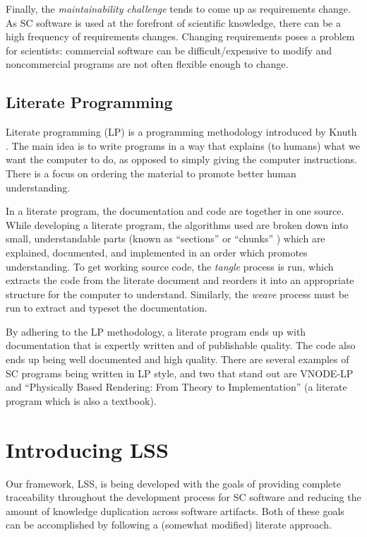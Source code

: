 \documentclass{sig-alternate-05-2015}
\newcommand{\lss}{LSS}
\begin{document}
Finally, the \textit{maintainability challenge} tends to come up as requirements
change. As SC software is used at the forefront of scientific knowledge, there
can be a high frequency of requirements changes. Changing requirements poses a
problem for scientists: commercial software can be difficult/expensive to modify
and noncommercial programs are not often flexible enough to change.

\subsection{Literate Programming} \label{ssec:literate}

Literate programming (LP) is a programming methodology introduced by Knuth
\cite{Knuth1984}. The main idea is to write programs in a way that explains (to
humans) what we want the computer to do, as opposed to simply giving the
computer instructions. There is a focus on ordering the material to promote
better human understanding.

In a literate program, the documentation and code are together in one source.
While developing a literate program, the algorithms used are broken down into
small, understandable parts (known as ``sections'' \cite{Knuth1984} or
``chunks'' \cite{JohnsonAndJohnson1997}) which are explained, documented, and
implemented in an order which promotes understanding. To get working
source code, the \textit{tangle} process is run, which extracts the code from
the literate document and reorders it into an appropriate structure for the
computer to understand. Similarly, the \textit{weave} process must be run to
extract and typeset the documentation.

By adhering to the LP methodology, a literate program ends up with documentation
that is expertly written and of publishable quality. The code also ends up being
well documented and high quality. There are several examples of SC
programs being written in LP style, and two that stand out are VNODE-LP
\cite{Nedialkov2006} and ``Physically Based Rendering: From Theory to
Implementation'' \cite{PharrAndHumphreys2004} (a literate program which is also
a textbook).

\section{Introducing \lss} \label{sec:lss} %

Our framework, \lss, is being developed with the goals of providing complete
traceability throughout the development process for SC software and reducing the
amount of knowledge duplication across software artifacts. Both of these goals
can be accomplished by following a (somewhat modified) literate approach.
\end{document}
